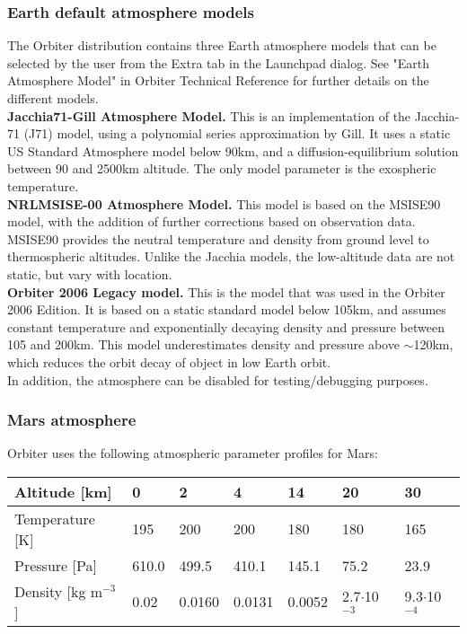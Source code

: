 \documentclass[Orbiter Developer Manual.tex]{subfiles}
\begin{document}
\subsubsection{Earth default atmosphere models}
The Orbiter distribution contains three Earth atmosphere models that can be selected by the user from the Extra tab in the Launchpad dialog. See "Earth Atmosphere Model" in Orbiter Technical Reference for further details on the different models.\\
\textbf{Jacchia71-Gill Atmosphere Model.} This is an implementation of the Jacchia-71 (J71) model\cite{jacchia71}, using a polynomial series approximation by Gill\cite{gill96}. It uses a static US Standard Atmosphere model below 90km, and a diffusion-equilibrium solution be­tween 90 and 2500km altitude. The only model parameter is the exospheric temperature.\\
\textbf{NRLMSISE-00 Atmosphere Model.} This model is based on the MSISE90 model, with the addition of further corrections based on observation data. MSISE90 provides the neutral temperature and density from ground level to thermospheric altitudes. Unlike the Jacchia models, the low-altitude data are not static, but vary with location.\\
\textbf{Orbiter 2006 Legacy model.} This is the model that was used in the Orbiter 2006 Edition. It is based on a static standard model\cite{anderson2000} below 105km, and assumes constant temperature and exponentially decaying density and pressure between 105 and 200km. This model underestimates density and pressure above $\sim$120km, which reduces the orbit decay of object in low Earth orbit.\\
In addition, the atmosphere can be disabled for testing/debugging purposes.

\subsubsection{Mars atmosphere}
Orbiter uses the following atmospheric parameter profiles for Mars:

	\begin{longtable}{ |p{}|p{}|p{}|p{}|p{}|p{}|p{}| }
	\hline\rule{0pt}{2ex}
	Altitude [km] & 0 & 2 & 4 & 14 & 20 & 30\\
	\hline\rule{0pt}{2ex}
	Temperature [K] & 195 & 200 & 200 & 180 & 180 & 165\\
	\hline\rule{0pt}{2ex}
	Pressure [Pa] & 610.0 & 499.5 & 410.1 & 145.1 & 75.2 & 23.9\\
	\hline\rule{0pt}{2ex}
	Density [kg m$^{-3}$] & 0.02 & 0.0160 & 0.0131 & 0.0052 & 2.7$\cdot$10$^{-3}$ & 9.3$\cdot$10$^{-4}$\\
	\hline
	\end{longtable}
\end{document}

